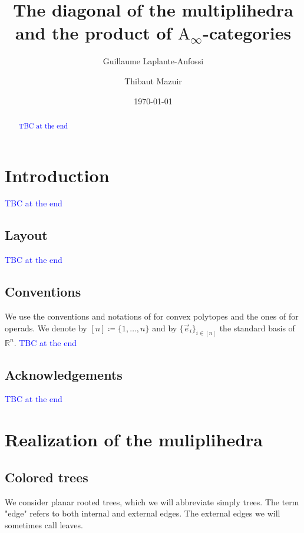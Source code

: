 \documentclass[twoside, 12pt]{amsart}
\title{The diagonal of the multiplihedra and the product of $\mathrm{A}_\infty$-categories}
\author{Guillaume Laplante-Anfossi}
\author{Thibaut Mazuir}
\date{\today}
\theoremstyle{remark}
\newcommand{\RR}{\mathbb{R}}
\newcommand{\Guillaume}[1]{\textcolor{blue}{#1}}
\begin{document}
\begin{abstract}
\Guillaume{TBC at the end}
\end{abstract}

\maketitle

\setcounter{tocdepth}{1}
\tableofcontents

\section*{Introduction}

\Guillaume{TBC at the end}

\medskip
\subsection*{Layout} 
\Guillaume{TBC at the end}

\medskip
\subsection*{Conventions} We use the conventions and notations of \cite{Ziegler95} for convex polytopes and the ones of  \cite{LodayVallette12} for operads. We denote by $[n]\coloneqq \{1,\ldots,n\}$ and by $\{\vec e_i\}_{i \in [n]}$ the standard basis of $\RR^n$.
\Guillaume{TBC at the end}

\subsection*{Acknowledgements} 
\Guillaume{TBC at the end}



\section{Realization of the muliplihedra} 



\subsection{Colored trees}

We consider planar rooted trees, which we will abbreviate simply trees. The term "edge" refers to both internal and external edges. The external edges we will sometimes call leaves. 
\end{document}
